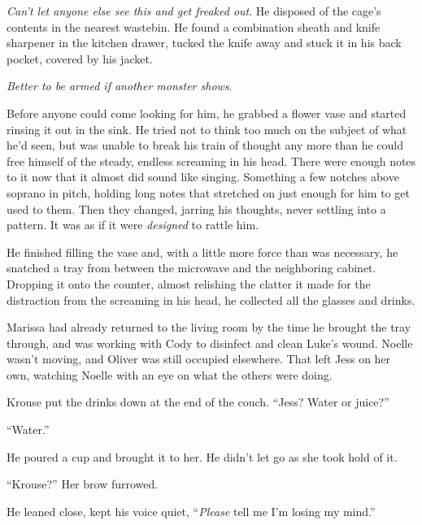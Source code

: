 \emph{Can't let anyone else see this and get freaked out}.  He disposed of the cage's contents in the nearest wastebin.  He found a combination sheath and knife sharpener in the kitchen drawer, tucked the knife away and stuck it in his back pocket, covered by his jacket.



\emph{Better to be armed if another monster shows}.



Before anyone could come looking for him, he grabbed a flower vase and started rinsing it out in the sink.  He tried not to think too much on the subject of what he'd seen, but was unable to break his train of thought any more than he could free himself of the steady, endless screaming in his head.  There were enough notes to it now that it almost did sound like singing.  Something a few notches above soprano in pitch, holding long notes that stretched on just enough for him to get used to them.  Then they changed, jarring his thoughts, never settling into a pattern.  It was as if it were \emph{designed} to rattle him.



He finished filling the vase and, with a little more force than was necessary, he snatched a tray from between the microwave and the neighboring cabinet.  Dropping it onto the counter, almost relishing the clatter it made for the distraction from the screaming in his head, he collected all the glasses and drinks.



Marissa had already returned to the living room by the time he brought the tray through, and was working with Cody to disinfect and clean Luke's wound.  Noelle wasn't moving, and Oliver was still occupied elsewhere.  That left Jess on her own, watching Noelle with an eye on what the others were doing.



Krouse put the drinks down at the end of the couch.  ``Jess?  Water or juice?''



``Water.''



He poured a cup and brought it to her.  He didn't let go as she took hold of it.



``Krouse?''  Her brow furrowed.



He leaned close, kept his voice quiet, ``\emph{Please} tell me I'm losing my mind.''



